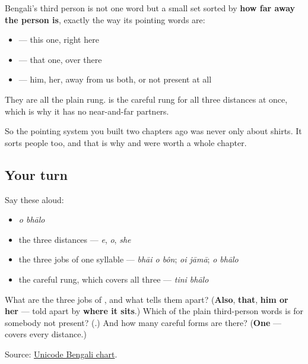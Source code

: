 \begin{grammarlens}[title={Grammar Lens: near, there, and away}]
Bengali's third person is not one word but a small set sorted by \textbf{how far away the person is}, exactly the way its pointing words are:

\begin{itemize}
\raggedright
  \item \textbf{} — this one, right here
  \item \textbf{} — that one, over there
  \item \textbf{} — him, her, away from us both, or not present at all
\end{itemize}

They are all the plain rung. \textbf{} is the careful rung for all three distances at once, which is why it has no near-and-far partners.

So the pointing system you built two chapters ago was never only about shirts. It sorts people too, and that is why \textbf{} and \textbf{} were worth a whole chapter.
\end{grammarlens}

\subsection*{Your turn}
Say these aloud:

\begin{itemize}
\raggedright
  \item \emph{o bhālo}
  \item the three distances — \emph{e}, \emph{o}, \emph{she}
  \item the three jobs of one syllable — \emph{bhāi o bôn}; \emph{oi jāmā}; \emph{o bhālo}
  \item the careful rung, which covers all three — \emph{tini bhālo}
\end{itemize}

\begin{tcolorbox}[breakable,colback=teal!4,colframe=teal!35!black,title={Before you move on}]
What are the three jobs of \textbf{}, and what tells them apart? (\textbf{Also}, \textbf{that}, \textbf{him or her} — told apart by \textbf{where it sits}.) Which of the plain third-person words is for somebody not present? (\textbf{}.) And how many careful forms are there? (\textbf{One} — \textbf{} covers every distance.)

Source: \href{https://www.unicode.org/charts/PDF/U0980.pdf}{Unicode Bengali chart}.
\end{tcolorbox}

